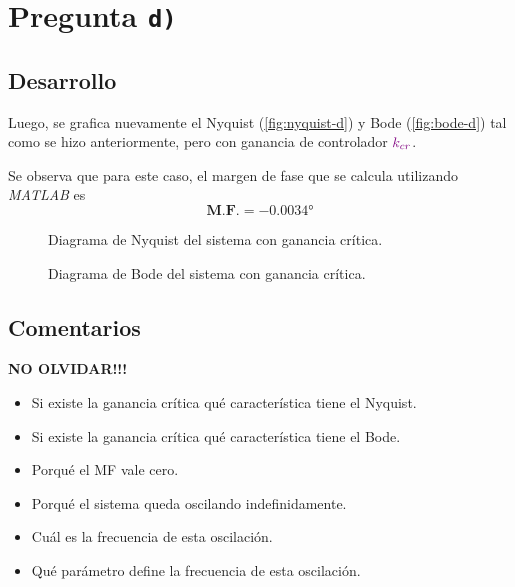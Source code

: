 \section{Pregunta \texttt{d)}}\label{pregunta-d}

\subsection{Desarrollo}

Luego, se grafica nuevamente el Nyquist (\autoref{fig:nyquist-d}) y Bode (\autoref{fig:bode-d})
tal como se hizo anteriormente, pero con ganancia de controlador $\mathbin{\color{violet}k_{cr}}$.

Se observa que para este caso, el margen de fase que se calcula utilizando
\textit{MATLAB} es
\begin{equation}
  \boxed{\textbf{M.F.} = \ang{-0.0034}}
\end{equation}

\begin{figure}[h]
  \centering
  
  \caption{Diagrama de Nyquist del sistema con ganancia crítica.}
  \label{fig:nyquist-d}
\end{figure}

\begin{figure}[h]
  \centering
  
  \caption{Diagrama de Bode del sistema con ganancia crítica.}
  \label{fig:bode-d}
\end{figure}


\FloatBarrier
\subsection{Comentarios}

\textbf{NO OLVIDAR!!!}



\begin{itemize}
  \item Si existe la ganancia crítica qué característica tiene el Nyquist.
  \item Si existe la ganancia crítica qué característica tiene el Bode.
  \item Porqué el MF vale cero.
  \item Porqué el sistema queda oscilando indefinidamente.
  \item Cuál es la frecuencia de esta oscilación.
  \item Qué parámetro define la frecuencia de esta oscilación.
\end{itemize}

